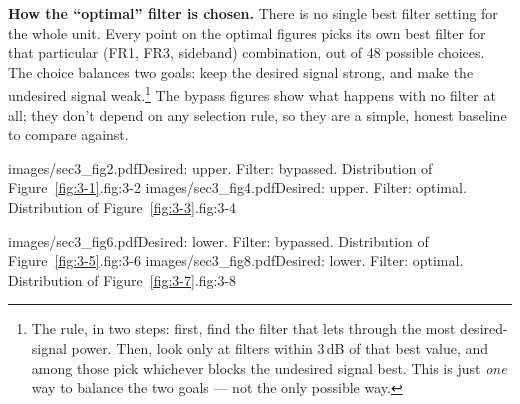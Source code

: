 \textbf{How the ``optimal'' filter is chosen.} There is no single best filter setting for the whole unit.
Every point on the optimal figures picks its own best filter for that particular (FR1, FR3, sideband)
combination, out of 48 possible choices. The choice balances two goals: keep the desired signal strong, and
make the undesired signal weak.\footnote{The rule, in two steps: first, find the filter that lets through the
most desired-signal power. Then, look only at filters within 3\,dB of that best value, and among those pick
whichever blocks the undesired signal best. This is just \emph{one} way to balance the two goals --- not the
only possible way.} The bypass figures show what happens with no filter at all; they don't depend on any
selection rule, so they are a simple, honest baseline to compare against.

%
        {images/sec3_fig2.pdf}{Desired: upper. Filter: bypassed. Distribution of Figure~\ref{fig:3-1}.}{fig:3-2}
%
        {images/sec3_fig4.pdf}{Desired: upper. Filter: optimal. Distribution of Figure~\ref{fig:3-3}.}{fig:3-4}

\newpage
{}%
        {images/sec3_fig6.pdf}{Desired: lower. Filter: bypassed. Distribution of Figure~\ref{fig:3-5}.}{fig:3-6}
%
        {images/sec3_fig8.pdf}{Desired: lower. Filter: optimal. Distribution of Figure~\ref{fig:3-7}.}{fig:3-8}
